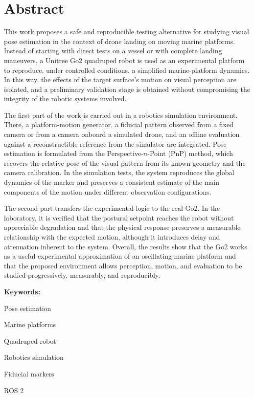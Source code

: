 \documentclass[12pt,a4paper]{report}
\begin{document}
\chapter*{Abstract}
This work proposes a safe and reproducible testing alternative for studying visual pose estimation in the context of drone landing on moving marine platforms. Instead of starting with direct tests on a vessel or with complete landing maneuvers, a Unitree Go2 quadruped robot is used as an experimental platform to reproduce, under controlled conditions, a simplified marine-platform dynamics. In this way, the effects of the target surface's motion on visual perception are isolated, and a preliminary validation stage is obtained without compromising the integrity of the robotic systems involved.

The first part of the work is carried out in a robotics simulation environment. There, a platform-motion generator, a fiducial pattern observed from a fixed camera or from a camera onboard a simulated drone, and an offline evaluation against a reconstructible reference from the simulator are integrated. Pose estimation is formulated from the Perspective-\(n\)-Point (PnP) method, which recovers the relative pose of the visual pattern from its known geometry and the camera calibration. In the simulation tests, the system reproduces the global dynamics of the marker and preserves a consistent estimate of the main components of the motion under different observation configurations.

The second part transfers the experimental logic to the real Go2. In the laboratory, it is verified that the postural setpoint reaches the robot without appreciable degradation and that the physical response preserves a measurable relationship with the expected motion, although it introduces delay and attenuation inherent to the system. Overall, the results show that the Go2 works as a useful experimental approximation of an oscillating marine platform and that the proposed environment allows perception, motion, and evaluation to be studied progressively, measurably, and reproducibly.

\vspace{2cm}
\noindent\textbf{Keywords:}
\begin{itemize*}[label={}, afterlabel={}, itemjoin={;\space}]
    \item Pose estimation
    \item Marine platforms
    \item Quadruped robot
    \item Robotics simulation
    \item Fiducial markers
    \item ROS 2
\end{itemize*}
\newpage
\end{document}
